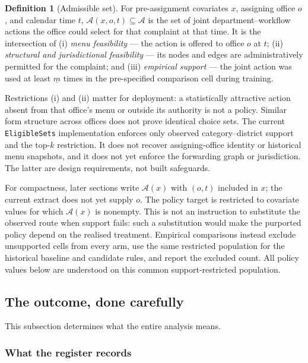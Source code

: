 \documentclass[11pt,a4paper]{article}
\theoremstyle{plain}
\theoremstyle{definition}
\newtheorem{definition}[theorem]{Definition}
\theoremstyle{remark}
\newcommand{\code}[1]{\texttt{\small #1}}
\begin{document}
\begin{definition}[Admissible set]\label{def:admissible}
For pre-assignment covariates $x$, assigning office $o$, and calendar time $t$,
$\mathcal A(x,o,t)\subseteq\mathcal A$ is the set of joint department--workflow actions the
office could select for that complaint at that time. It is the intersection of (i)
\emph{menu feasibility} --- the action is offered to office $o$ at $t$; (ii) \emph{structural
and jurisdictional feasibility} --- its nodes and edges are administratively permitted for the
complaint; and (iii) \emph{empirical support} --- the joint action was used at least
$\underline m$ times in the pre-specified comparison cell during training.
\end{definition}

Restrictions (i) and (ii) matter for deployment: a statistically attractive action absent from
that office's menu or outside its authority is not a policy. Similar form structure across
offices does not prove identical choice sets. The current \code{EligibleSets} implementation
enforces only observed category--district support and the top-$k$ restriction. It does not
recover assigning-office identity or historical menu snapshots, and it does not yet enforce the
forwarding graph or jurisdiction. The latter are design requirements, not built safeguards.

For compactness, later sections write $\mathcal A(x)$ with $(o,t)$ included in $x$; the current
extract does not yet supply $o$. The policy target is restricted to covariate values for which
$\mathcal A(x)$ is nonempty.
This is not an instruction to substitute the observed route when support fails: such a
substitution would make the purported policy depend on the realised treatment. Empirical
comparisons instead exclude unsupported cells from every arm, use the same restricted
population for the historical baseline and candidate rules, and report the excluded count.
All policy values below are understood on this common support-restricted population.

\subsection{The outcome, done carefully}\label{sec:outcome}

This subsection determines what the entire analysis means.

\subsubsection{What the register records}
\end{document}
